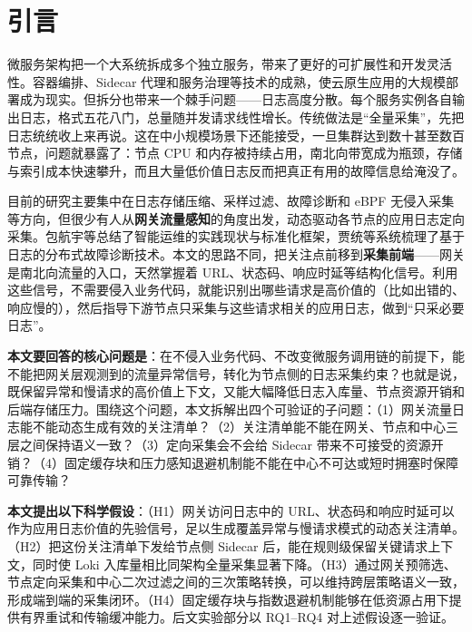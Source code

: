 \section{引言}

微服务架构把一个大系统拆成多个独立服务，带来了更好的可扩展性和开发灵活性。容器编排、Sidecar 代理和服务治理等技术的成熟，使云原生应用的大规模部署成为现实\cite{burns2016patterns,burns2016borg,jamshidi2018microservices,richardson2018microservices,feng2020microservice,wuhuayao2020microdev}。但拆分也带来一个棘手问题——日志高度分散。每个服务实例各自输出日志，格式五花八门，总量随并发请求线性增长。传统做法是``全量采集''，先把日志统统收上来再说。这在中小规模场景下还能接受，一旦集群达到数十甚至数百节点，问题就暴露了：节点 CPU 和内存被持续占用，南北向带宽成为瓶颈，存储与索引成本快速攀升，而且大量低价值日志反而把真正有用的故障信息给淹没了\cite{liao2016logs,limingshu2019logmgmt,he2020logsurvey,usman2022observability}。

目前的研究主要集中在日志存储压缩、采样过滤、故障诊断和 eBPF 无侵入采集等方向，但很少有人从\textbf{网关流量感知}的角度出发，动态驱动各节点的应用日志定向采集。包航宇等\cite{bao2023aiops}总结了智能运维的实践现状与标准化框架，贾统等\cite{jiatong2020logdiag}系统梳理了基于日志的分布式故障诊断技术。本文的思路不同，把关注点前移到\textbf{采集前端}——网关是南北向流量的入口，天然掌握着 URL、状态码、响应时延等结构化信号。利用这些信号，不需要侵入业务代码，就能识别出哪些请求是高价值的（比如出错的、响应慢的），然后指导下游节点只采集与这些请求相关的应用日志，做到``只采必要日志''。

\textbf{本文要回答的核心问题是}：在不侵入业务代码、不改变微服务调用链的前提下，能不能把网关层观测到的流量异常信号，转化为节点侧的日志采集约束？也就是说，既保留异常和慢请求的高价值上下文，又能大幅降低日志入库量、节点资源开销和后端存储压力。围绕这个问题，本文拆解出四个可验证的子问题：（1）网关流量日志能不能动态生成有效的关注清单？（2）关注清单能不能在网关、节点和中心三层之间保持语义一致？（3）定向采集会不会给 Sidecar 带来不可接受的资源开销？（4）固定缓存块和压力感知退避机制能不能在中心不可达或短时拥塞时保障可靠传输？

\textbf{本文提出以下科学假设}：（H1）网关访问日志中的 URL、状态码和响应时延可以作为应用日志价值的先验信号，足以生成覆盖异常与慢请求模式的动态关注清单。（H2）把这份关注清单下发给节点侧 Sidecar 后，能在规则级保留关键请求上下文，同时使 Loki 入库量相比同架构全量采集显著下降。（H3）通过网关预筛选、节点定向采集和中心二次过滤之间的三次策略转换，可以维持跨层策略语义一致，形成端到端的采集闭环。（H4）固定缓存块与指数退避机制能够在低资源占用下提供有界重试和传输缓冲能力。后文实验部分以 RQ1--RQ4 对上述假设逐一验证。

